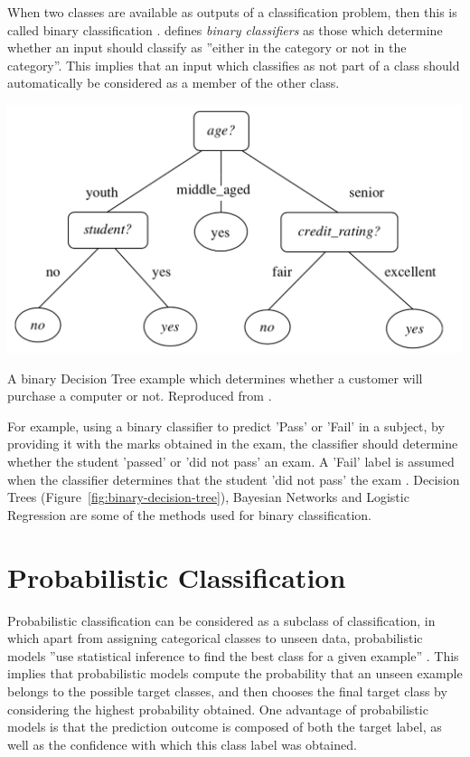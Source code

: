 When two classes are available as outputs of a classification problem, then this is called binary classification \citep{neelamegam2013}. \citet{kolo2011} defines \textit{binary classifiers} as those which determine whether an input should classify as ''either in the category or not in the category''. This implies that an input which classifies as not part of a class should automatically be considered as a member of the other class. \begin{marginfigure}
    \includegraphics{graphics/classification/BinaryDecisionTree.png}
    \caption{
    A binary Decision Tree example which determines whether a customer will purchase a computer or not. 
    Reproduced from \citet{jiawei2011}.
    }
    \label{fig:binary-decision-tree}
\end{marginfigure}
For example,  using a binary classifier to predict 'Pass' or 'Fail' in a subject, by providing it with the marks obtained in the exam, the classifier should determine whether the student 'passed' or 'did not pass' an exam. A 'Fail' label is assumed when the classifier determines that the student 'did not pass' the exam \citep{kolo2011}. Decision Trees (Figure~\ref{fig:binary-decision-tree}), Bayesian Networks and Logistic Regression are some of the methods used for binary classification.  

\section{Probabilistic Classification}
\label{sec:probabilistic classification}
Probabilistic classification can be considered as a subclass of classification, in which apart from assigning categorical classes to unseen data, probabilistic models ''use statistical inference to find the best class for a given example'' \citep{aggarwal2014}. This implies that probabilistic models compute the probability that an unseen example belongs to the possible target classes, and then chooses the final target class by considering the highest probability obtained. One advantage of probabilistic models is that the prediction outcome is composed of both the target label, as well as the confidence with which this class label was obtained. 

